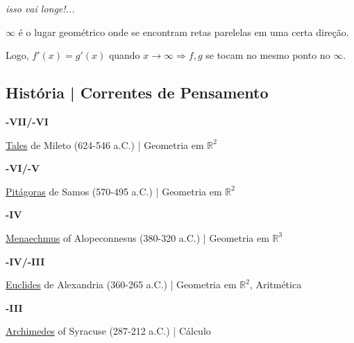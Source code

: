 \documentclass[12pt,a4paper]{article}
\begin{document}
				\emph{isso vai longe!...}

				$ \infty $ \'e o lugar geom\'etrico onde se encontram retas parelelas em uma certa dire\c{c}\~ao.

				Logo, $f'(x) = g'(x)$ quando $ x \rightarrow \infty \Rightarrow f, g $ se tocam no mesmo ponto no $ \infty $.

		\subsection{Hist\'oria | Correntes de Pensamento}
			\begin{flushright}
			\end{flushright}

			\textbf{-VII/-VI}

			\href{http://pt.wikipedia.org/wiki/Tales_de_Mileto}{Tales} de Mileto (624-546 a.C.) | Geometria em $ \mathbb{R}^2 $

			\begin{flushright}
			\end{flushright}

			\textbf{-VI/-V}

			\href{http://en.wikipedia.org/wiki/Pythagoras}{Pit\'agoras} de Samos (570-495 a.C.) | Geometria em $ \mathbb{R}^2 $

			\begin{flushright}
			\end{flushright}

			\textbf{-IV}

			\href{http://en.wikipedia.org/wiki/Menaechmus}{Menaechmus} of Alopeconnesus (380-320 a.C.) | Geometria em $ \mathbb{R}^3 $

			\begin{flushright}
			\end{flushright}

			\textbf{-IV/-III}

			\href{http://pt.wikipedia.org/wiki/Euclides}{Euclides} de Alexandria (360-265 a.C.) | Geometria em $ \mathbb{R}^2 $, Aritm\'etica

			\begin{flushright}
			\end{flushright}

			\textbf{-III}

			\href{http://en.wikipedia.org/wiki/Archimedes#Mathematics}{Archimedes} of Syracuse (287-212 a.C.) | C\'alculo

			\begin{flushright}
			\end{flushright}
\end{document}
